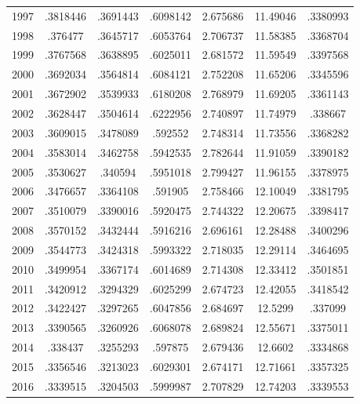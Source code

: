 {\begin{longtable}{l*{1}{cccccc}}
1997        &    .3818446&    .3691443&    .6098142&    2.675686&    11.49046&    .3380993\\
1998        &     .376477&    .3645717&    .6053764&    2.706737&    11.58385&    .3368704\\
1999        &    .3767568&    .3638895&    .6025011&    2.681572&    11.59549&    .3397568\\
2000        &    .3692034&    .3564814&    .6084121&    2.752208&    11.65206&    .3345596\\
2001        &    .3672902&    .3539933&    .6180208&    2.768979&    11.69205&    .3361143\\
2002        &    .3628447&    .3504614&    .6222956&    2.740897&    11.74979&     .338667\\
2003        &    .3609015&    .3478089&     .592552&    2.748314&    11.73556&    .3368282\\
2004        &    .3583014&    .3462758&    .5942535&    2.782644&    11.91059&    .3390182\\
2005        &    .3530627&     .340594&    .5951018&    2.799427&    11.96155&    .3378975\\
2006        &    .3476657&    .3364108&     .591905&    2.758466&    12.10049&    .3381795\\
2007        &    .3510079&    .3390016&    .5920475&    2.744322&    12.20675&    .3398417\\
2008        &    .3570152&    .3432444&    .5916216&    2.696161&    12.28488&    .3400296\\
2009        &    .3544773&    .3424318&    .5993322&    2.718035&    12.29114&    .3464695\\
2010        &    .3499954&    .3367174&    .6014689&    2.714308&    12.33412&    .3501851\\
2011        &    .3420912&    .3294329&    .6025299&    2.674723&    12.42055&    .3418542\\
2012        &    .3422427&    .3297265&    .6047856&    2.684697&     12.5299&     .337099\\
2013        &    .3390565&    .3260926&    .6068078&    2.689824&    12.55671&    .3375011\\
2014        &     .338437&    .3255293&     .597875&    2.679436&     12.6602&    .3334868\\
2015        &    .3356546&    .3213023&    .6029301&    2.674171&    12.71661&    .3357325\\
2016        &    .3339515&    .3204503&    .5999987&    2.707829&    12.74203&    .3339553\\

\end{longtable}}
